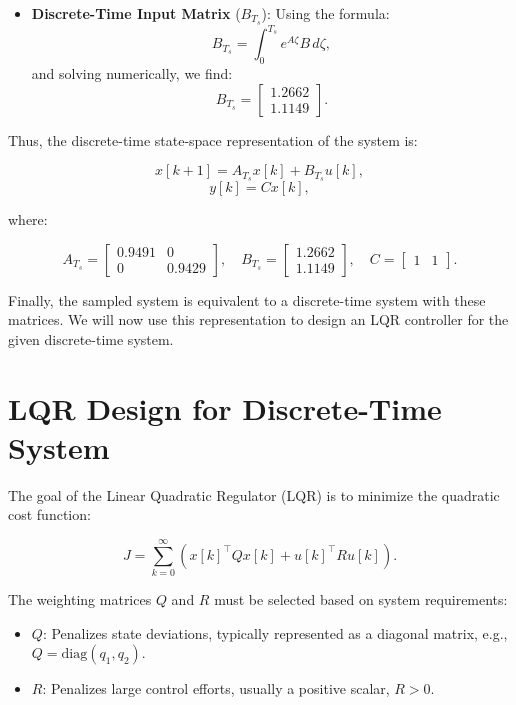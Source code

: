 \begin{itemize} 
    \item \textbf{Discrete-Time Input Matrix} (\(B_{T_s}\)): 
   Using the formula:
   \[
   B_{T_s} = \int_0^{T_s} e^{A \zeta} B \, d\zeta,
   \]
   and solving numerically, we find:
   \[
   B_{T_s} = 
   \begin{bmatrix}
   1.2662 \\
   1.1149
   \end{bmatrix}.
   \]
\end{itemize}

Thus, the discrete-time state-space representation of the system is:

\[
x[k+1] = A_{T_s} x[k] + B_{T_s} u[k],
\]
\[
y[k] = C x[k],
\]

where:

\[
A_{T_s} = 
\begin{bmatrix}
0.9491 & 0 \\
0 & 0.9429
\end{bmatrix}, \quad
B_{T_s} = 
\begin{bmatrix}
1.2662 \\
1.1149
\end{bmatrix}, \quad
C = 
\begin{bmatrix}
1 & 1
\end{bmatrix}.
\]

Finally, the sampled system is equivalent to a discrete-time system with these matrices. We will now use this representation to design an LQR controller for the given discrete-time system.

\section{LQR Design for Discrete-Time System}

The goal of the Linear Quadratic Regulator (LQR) is to minimize the quadratic cost function:

\[
J = \sum_{k=0}^\infty \left( x[k]^\top Q x[k] + u[k]^\top R u[k] \right).
\]

The weighting matrices \( Q \) and \( R \) must be selected based on system requirements:

\begin{itemize}
    \item \( Q \): Penalizes state deviations, typically represented as a diagonal matrix, e.g., \( Q = \text{diag}(q_1, q_2) \).
    \item \( R \): Penalizes large control efforts, usually a positive scalar, \( R > 0 \).
\end{itemize}

